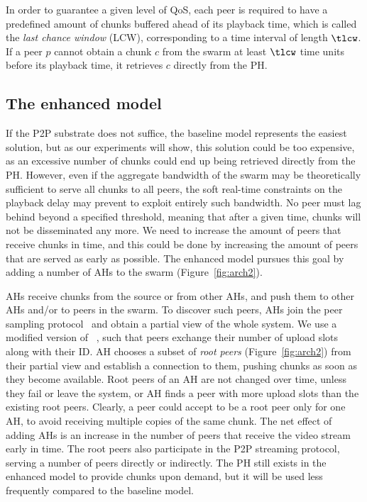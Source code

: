 In order to guarantee a
given level of QoS, each peer is required to have a predefined amount of
chunks buffered ahead of its playback time, which is called the \emph{last
chance window} (LCW), corresponding to a time interval of length $\tlcw$.
If a peer $p$ cannot obtain a chunk $c$ from the swarm at least $\tlcw$ time units before its playback time,
it retrieves $c$ directly from the PH.

\subsection{The enhanced model}

If the P2P substrate does not suffice, the baseline model represents the
easiest solution, but as our experiments will show, this solution could be too
expensive, as an excessive number of chunks could end up being retrieved
directly from the PH. However, even if the aggregate bandwidth of the swarm
may be theoretically sufficient to serve all chunks to all peers, the soft
real-time constraints on the playback delay may prevent to exploit entirely
such bandwidth. No peer must lag behind beyond a specified threshold, meaning
that after a given time, chunks will not be disseminated any more. We need to
increase the amount of peers that receive chunks in time, and this could be
done by increasing the amount of peers that are served as early as possible.
The enhanced model pursues this goal by adding a number of AHs to the swarm
(Figure~\ref{fig:arch2}).

AHs receive chunks from the source or from other AHs, and push them to other
AHs and/or to peers in the swarm. To discover such peers, AHs join the peer
sampling protocol~\cite{cyclon} and obtain a partial view of the whole system.
We use a modified version of \cyclon~\cite{cyclon}, such that peers exchange
their number of upload slots along with their ID. AH chooses a subset of
\emph{root peers} (Figure~\ref{fig:arch2}) from their partial view and
establish a connection to them, pushing chunks as soon as they become
available. Root peers of an AH are not changed over time, unless they fail or
leave the system, or AH finds a peer with more upload slots than the existing
root peers. Clearly, a peer could accept to be a root peer only for one AH, to
avoid receiving multiple copies of the same chunk. The net effect of adding
AHs is an increase in the number of peers that receive the video stream early
in time. The root peers also participate in the P2P streaming protocol,
serving a number of peers directly or indirectly. The PH still exists in the
enhanced model to provide chunks upon demand, but it will be used less
frequently compared to the baseline model.

